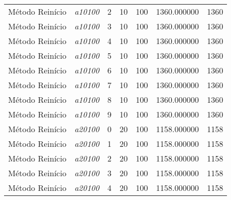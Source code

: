 {\begin{longtable}{cc|c|cc|cc}
			Método Reinício    & \textit{a10100}    & 2                               & 10               & 100              & 1360.000000                          & 1360 \\ 
			Método Reinício    & \textit{a10100}    & 3                               & 10               & 100              & 1360.000000                          & 1360 \\ 
			Método Reinício    & \textit{a10100}    & 4                               & 10               & 100              & 1360.000000                          & 1360 \\ 
			Método Reinício    & \textit{a10100}    & 5                               & 10               & 100              & 1360.000000                          & 1360 \\ 
			Método Reinício    & \textit{a10100}    & 6                               & 10               & 100              & 1360.000000                          & 1360 \\ 
			Método Reinício    & \textit{a10100}    & 7                               & 10               & 100              & 1360.000000                          & 1360 \\ 
			Método Reinício    & \textit{a10100}    & 8                               & 10               & 100              & 1360.000000                          & 1360 \\ 
			Método Reinício    & \textit{a10100}    & 9                               & 10               & 100              & 1360.000000                          & 1360 \\ \hline
			Método Reinício    & \textit{a20100}    & 0                               & 20               & 100              & 1158.000000                          & 1158 \\ 
			Método Reinício    & \textit{a20100}    & 1                               & 20               & 100              & 1158.000000                          & 1158 \\ 
			Método Reinício    & \textit{a20100}    & 2                               & 20               & 100              & 1158.000000                          & 1158 \\ 
			Método Reinício    & \textit{a20100}    & 3                               & 20               & 100              & 1158.000000                          & 1158 \\ 
			Método Reinício    & \textit{a20100}    & 4                               & 20               & 100              & 1158.000000                          & 1158 \\ 

\end{longtable}}
